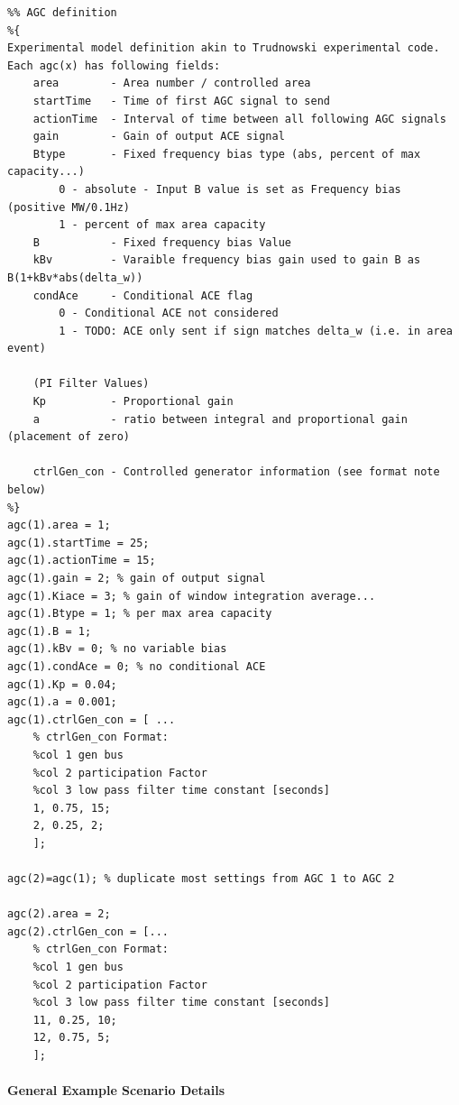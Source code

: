 \documentclass[12pt]{article}
\begin{document}
\begin{verbatim}
%% AGC definition
%{ 
Experimental model definition akin to Trudnowski experimental code.
Each agc(x) has following fields:
    area        - Area number / controlled area
    startTime   - Time of first AGC signal to send
    actionTime  - Interval of time between all following AGC signals
    gain        - Gain of output ACE signal
    Btype       - Fixed frequency bias type (abs, percent of max capacity...)
        0 - absolute - Input B value is set as Frequency bias (positive MW/0.1Hz)
        1 - percent of max area capacity
    B           - Fixed frequency bias Value
    kBv         - Varaible frequency bias gain used to gain B as B(1+kBv*abs(delta_w))
    condAce     - Conditional ACE flag
        0 - Conditional ACE not considered
        1 - TODO: ACE only sent if sign matches delta_w (i.e. in area event)

    (PI Filter Values)
    Kp          - Proportional gain
    a           - ratio between integral and proportional gain (placement of zero)

    ctrlGen_con - Controlled generator information (see format note below)
%}
agc(1).area = 1;
agc(1).startTime = 25;
agc(1).actionTime = 15;
agc(1).gain = 2; % gain of output signal
agc(1).Kiace = 3; % gain of window integration average...
agc(1).Btype = 1; % per max area capacity
agc(1).B = 1;
agc(1).kBv = 0; % no variable bias
agc(1).condAce = 0; % no conditional ACE
agc(1).Kp = 0.04;
agc(1).a = 0.001;
agc(1).ctrlGen_con = [ ...
    % ctrlGen_con Format:
    %col 1 gen bus
    %col 2 participation Factor
    %col 3 low pass filter time constant [seconds]
    1, 0.75, 15;
    2, 0.25, 2;
    ];

agc(2)=agc(1); % duplicate most settings from AGC 1 to AGC 2

agc(2).area = 2;
agc(2).ctrlGen_con = [...
    % ctrlGen_con Format:
    %col 1 gen bus
    %col 2 participation Factor
    %col 3 low pass filter time constant [seconds]
    11, 0.25, 10;
    12, 0.75, 5;
    ];
\end{verbatim}

\pagebreak
\paragraph{General Example Scenario Details} \ \\
\end{document}
